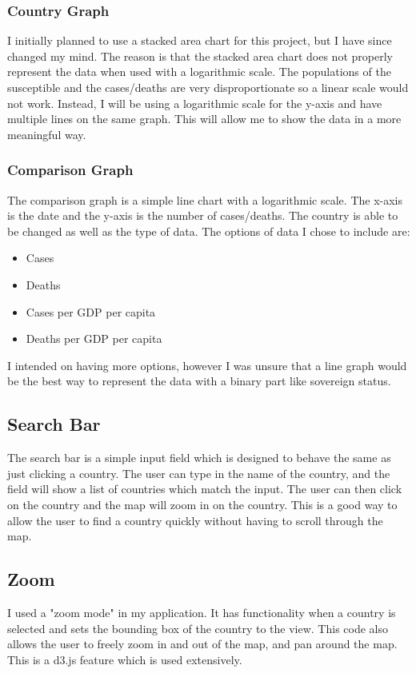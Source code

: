 \documentclass{report}
\begin{document}
\subsubsection{Country Graph}
I initially planned to use a stacked area chart for this project, but I have since changed my mind. The reason is that the stacked area chart does not properly represent the data when used with a logarithmic scale. The populations of the susceptible and the cases/deaths are very disproportionate so a linear scale would not work. Instead, I will be using a logarithmic scale for the y-axis and have multiple lines on the same graph. This will allow me to show the data in a more meaningful way.
\subsubsection{Comparison Graph}
The comparison graph is a simple line chart with a logarithmic scale. The x-axis is the date and the y-axis is the number of cases/deaths. The country is able to be changed as well as the type of data. The options of data I chose to include are:
\begin{itemize}
    \item Cases
    \item Deaths
    \item Cases per GDP per capita
    \item Deaths per GDP per capita
\end{itemize}
I intended on having more options, however I was unsure that a line graph would be the best way to represent the data with a binary part like sovereign status.
\subsection{Search Bar}
The search bar is a simple input field which is designed to behave the same as just clicking a country. The user can type in the name of the country, and the field will show a list of countries which match the input. The user can then click on the country and the map will zoom in on the country. This is a good way to allow the user to find a country quickly without having to scroll through the map.

\subsection{Zoom}
I used a "zoom mode" in my application. It has functionality when a country is selected and sets the bounding box of the country to the view. This code also allows the user to freely zoom in and out of the map, and pan around the map. This is a d3.js feature which is used extensively.
\end{document}
